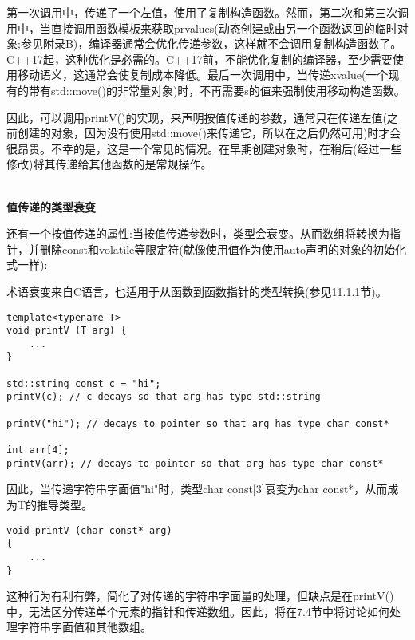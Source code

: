 第一次调用中，传递了一个左值，使用了复制构造函数。然而，第二次和第三次调用中，当直接调用函数模板来获取prvalues(动态创建或由另一个函数返回的临时对象;参见附录B)，编译器通常会优化传递参数，这样就不会调用复制构造函数了。C++17起，这种优化是必需的。C++17前，不能优化复制的编译器，至少需要使用移动语义，这通常会使复制成本降低。最后一次调用中，当传递xvalue(一个现有的带有std::move()的非常量对象)时，不再需要s的值来强制使用移动构造函数。

因此，可以调用printV()的实现，来声明按值传递的参数，通常只在传递左值(之前创建的对象，因为没有使用std::move()来传递它，所以在之后仍然可用)时才会很昂贵。不幸的是，这是一个常见的情况。在早期创建对象时，在稍后(经过一些修改)将其传递给其他函数的是常规操作。

\hspace*{\fill} \\ %
\noindent
\textbf{值传递的类型衰变}

还有一个按值传递的属性:当按值传递参数时，类型会衰变。从而数组将转换为指针，并删除const和volatile等限定符(就像使用值作为使用auto声明的对象的初始化式一样):

\begin{tcolorbox}[colback=webgreen!5!white,colframe=webgreen!75!black]
\hspace*{0.75cm}术语衰变来自C语言，也适用于从函数到函数指针的类型转换(参见11.1.1节)。
\end{tcolorbox}

\begin{lstlisting}[style=styleCXX]
template<typename T>
void printV (T arg) {
	...
}

std::string const c = "hi";
printV(c); // c decays so that arg has type std::string

printV("hi"); // decays to pointer so that arg has type char const*

int arr[4];
printV(arr); // decays to pointer so that arg has type char const*
\end{lstlisting}

因此，当传递字符串字面值"hi"时，类型char const[3]衰变为char const*，从而成为T的推导类型。

\begin{lstlisting}[style=styleCXX]
void printV (char const* arg)
{
	...
}
\end{lstlisting}

这种行为有利有弊，简化了对传递的字符串字面量的处理，但缺点是在printV()中，无法区分传递单个元素的指针和传递数组。因此，将在7.4节中将讨论如何处理字符串字面值和其他数组。




